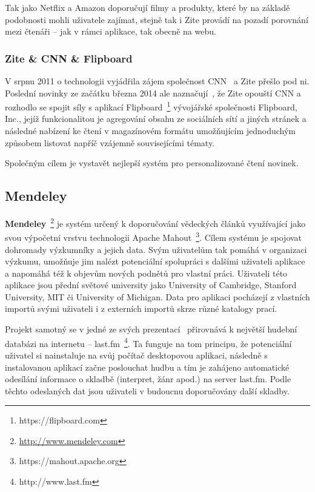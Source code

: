 \documentclass[thesis=M,czech]{FITthesis}[2014/05/07]
\begin{document}
Tak jako Netflix a Amazon doporučují filmy a produkty, které by na základě podobnosti mohli uživatele zajímat, stejně tak i Zite provádí na pozadí porovnání mezi čtenáři – jak v rámci aplikace, tak obecně na webu.

\subsubsection{Zite \& CNN \& Flipboard}
V srpnu 2011 o technologii vyjádřila zájem společnost CNN~\cite{zitecnn} a Zite přešlo pod ni. Poslední novinky ze začátku března 2014 ale naznačují~\cite{ziteflip}, že Zite opouští CNN a rozhodlo se spojit síly s aplikací Flipboard~\footnote{https://flipboard.com} vývojářské společnosti Flipboard, Inc., jejíž funkcionalitou je agregování obsahu ze sociálních sítí a jiných stránek a následné nabízení ke čtení v magazínovém formátu umožňujícím jednoduchým způsobem listovat napříč vzájemně souvisejícími tématy.

Společným cílem je vystavět nejlepší systém pro personalizované čtení novinek. 

\subsection{Mendeley}	

\textbf{Mendeley}~\footnote{\url{http://www.mendeley.com}} je systém určený k doporučování vědeckých článků využívající jako svou výpočetní vrstvu technologii Apache Mahout~\footnote{https://mahout.apache.org}. Cílem systému je spojovat dohromady výzkumníky a jejich data. Svým uživatelům tak pomáhá v organizaci výzkumu, umožňuje jim nalézt potenciální spolupráci s dalšími uživateli aplikace a napomáhá též k objevům nových podnětů pro vlastní práci. Uživateli této aplikace jsou přední světové university jako University of Cambridge, Stanford University, MIT či University of Michigan. Data pro aplikaci pocházejí z vlastních importů svými uživateli i z externích importů skrze různé katalogy prací. 

Projekt samotný se v jedné ze svých prezentací~\cite{mendeleylastfm} přirovnává k největší hudební databázi na internetu – last.fm~\footnote{http://www.last.fm}. Ta funguje na tom principu, že potenciální uživatel si nainstaluje na svůj počítač desktopovou aplikaci, následně s instalovanou aplikací začne poslouchat hudbu a tím je zahájeno automatické odesílání informace o skladbě (interpret, žánr apod.) na server last.fm. Podle těchto odeslaných dat jsou uživateli v budoucnu doporučovány další skladby. 
\end{document}
